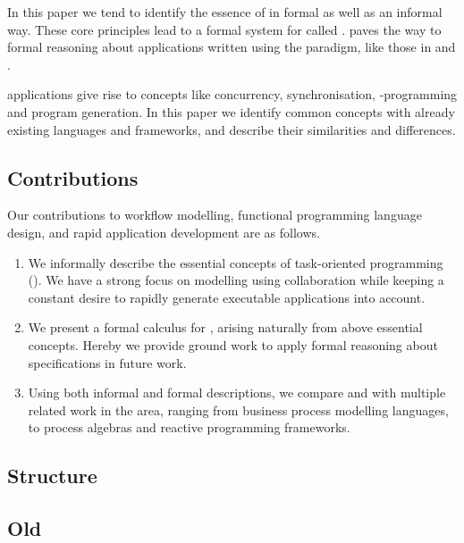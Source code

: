 In this paper we tend to identify the essence of \TOP in formal as well as an informal way.
These core principles lead to a formal system for \TOP called \TOPHAT.
\TOPHAT paves the way to formal reasoning about applications written using the \TOP paradigm,
like those in \ITASKS and \MTASKS.

\TOP applications give rise to concepts like concurrency, synchronisation, \GUI-programming and program generation.
In this paper we identify common concepts with already existing languages and frameworks,
and describe their similarities and differences.



\subsection{Contributions}

Our contributions to workflow modelling, functional programming language design, and rapid application development are as follows.

\begin{enumerate}

  \item
    We informally describe the essential concepts of task-oriented programming (\TOP).
    We have a strong focus on modelling using collaboration
    while keeping a constant desire to rapidly generate executable applications into account.

  \item
    We present a formal calculus for \TOP, arising naturally from above essential concepts.
    Hereby we provide ground work to apply formal reasoning about \TOP specifications in future work.

  \item
    Using both informal and formal descriptions, we compare \TOP and \TOPHAT with multiple related work in the area,
    ranging from business process modelling languages, to process algebras and reactive programming frameworks.

\end{enumerate}



\subsection{Structure}





\subsection{Old}


